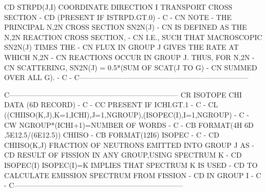 \begin{ccode}
CD    STRPD(J,I)   COORDINATE DIRECTION I TRANSPORT CROSS SECTION      -
CD                              (PRESENT IF ISTRPD.GT.0)               -
C                                                                      -
CN                 NOTE - THE PRINCIPAL N,2N CROSS SECTION SN2N(J)     -
CN                    IS DEFINED AS THE N,2N REACTION CROSS SECTION,   -
CN                    I.E., SUCH THAT MACROSCOPIC SN2N(J) TIMES THE    -
CN                    FLUX IN GROUP J GIVES THE RATE AT WHICH N,2N     -
CN                    REACTIONS OCCUR IN GROUP J.  THUS, FOR N,2N      -
CN                    SCATTERING, SN2N(J) = 0.5*(SUM OF SCAT(J TO G)   -
CN                    SUMMED OVER ALL G).                              -
C                                                                      -
C-----------------------------------------------------------------------

C-----------------------------------------------------------------------
CR          ISOTOPE CHI DATA   (6D RECORD)                             -
C                                                                      -
CC          PRESENT IF ICHI.GT.1                                       -
C                                                                      -
CL    ((CHIISO(K,J),K=1,ICHI),J=1,NGROUP),(ISOPEC(I),I=1,NGROUP)       -
C                                                                      -
CW    NGROUP*(ICHI+1)=NUMBER OF WORDS                                  -
C                                                                      -
CB    FORMAT(4H 6D ,5E12.5/(6E12.5))   CHIISO                          -
CB    FORMAT(12I6)                     ISOPEC                          -
C                                                                      -
CD    CHIISO(K,J)   FRACTION OF NEUTRONS EMITTED INTO GROUP J AS       -
CD                     RESULT OF FISSION IN ANY GROUP,USING SPECTRUM K -
CD    ISOPEC(I)     ISOPEC(I)=K IMPLIES THAT SPECTRUM K IS USED        -
CD                     TO CALCULATE EMISSION SPECTRUM FROM FISSION     -
CD                     IN GROUP I                                      -
C                                                                      -
C-----------------------------------------------------------------------


\end{ccode}
